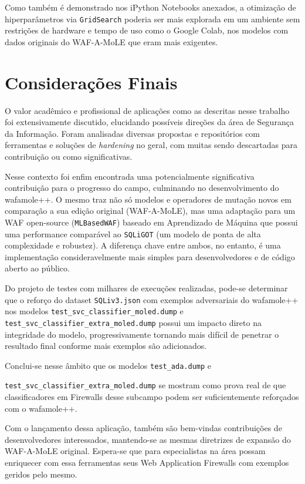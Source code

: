 Como também é demonstrado nos iPython Notebooks anexados, a otimização de hiperparâmetros via \verb+GridSearch+ poderia ser mais explorada em um ambiente sem restrições de hardware e tempo de uso como o Google Colab, nos modelos com dados originais do WAF-A-MoLE que eram mais exigentes. 

\section{Considerações Finais}
O valor acadêmico e profissional de aplicações como as descritas nesse trabalho foi extensivamente discutido, elucidando possíveis direções da área de Segurança da Informação. Foram analisadas diversas propostas e repositórios com ferramentas e soluções de \textit{hardening} no geral, com muitas sendo descartadas para contribuição ou como significativas. 

Nesse contexto foi enfim encontrada uma potencialmente significativa contribuição para o progresso do campo, culminando no desenvolvimento do wafamole++. O mesmo traz não só modelos e operadores de mutação novos em comparação a sua edição original (WAF-A-MoLE), mas uma adaptação para um WAF open-source (\verb+MLBasedWAF+) baseado em Aprendizado de Máquina que possui uma performance comparável ao \verb+SQLiGOT+ (um modelo de ponta de alta complexidade e robustez). A diferença chave entre ambos, no entanto, é uma implementação consideravelmente mais simples para desenvolvedores e de código aberto ao público.

Do projeto de testes com milhares de execuções realizadas, pode-se determinar que o reforço do dataset \verb+SQLiv3.json+ com exemplos adversariais do wafamole++ nos modelos \verb+test_svc_classifier_moled.dump+ e \verb+test_svc_classifier_extra_moled.dump+ possui um impacto direto na integridade do modelo, progressivamente tornando mais difícil de penetrar o resultado final conforme mais exemplos são adicionados.

Conclui-se nesse âmbito que os modelos \verb+test_ada.dump+ e 

\verb+test_svc_classifier_extra_moled.dump+ se mostram como prova real de que classificadores em Firewalls desse subcampo podem ser suficientemente reforçados com o wafamole++.

Com o lançamento dessa aplicação, também são bem-vindas contribuições de desenvolvedores interessados, mantendo-se as mesmas diretrizes de expansão do WAF-A-MoLE original. Espera-se que para especialistas na área possam enriquecer com essa ferramentas seus Web Application Firewalls com exemplos geridos pelo mesmo.

